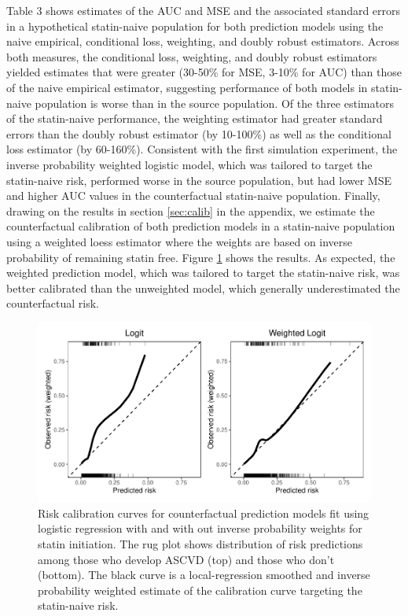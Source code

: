 Table 3 shows estimates of the AUC and MSE and the associated standard errors in a hypothetical statin-naive population for both prediction models using the naive empirical, conditional loss, weighting, and doubly robust estimators. Across both measures, the conditional loss, weighting, and doubly robust estimators yielded estimates that were greater (30-50\% for MSE, 3-10\% for AUC) than those of the naive empirical estimator, suggesting performance of both models in statin-naive population is worse than in the source population. Of the three estimators of the statin-naive performance, the weighting estimator had greater standard errors than the doubly robust estimator (by 10-100\%) as well as the conditional loss estimator (by 60-160\%). Consistent with the first simulation experiment, the inverse probability weighted logistic model, which was tailored to target the statin-naive risk, performed worse in the source population, but had lower MSE and higher AUC values in the counterfactual statin-naive population. Finally, drawing on the results in section \ref{sec:calib} in the appendix, we estimate the counterfactual calibration of both prediction models in a statin-naive population using a weighted loess estimator where the weights are based on inverse probability of remaining statin free. Figure \ref{fig:calib} shows the results. As expected, the weighted prediction model, which was tailored to target the statin-naive risk, was better calibrated than the unweighted model, which generally underestimated the counterfactual risk.

\begin{figure}[p]
    \centering
    \includegraphics{../3_figures/calib.pdf}
    \caption{Risk calibration curves for counterfactual prediction models fit using logistic regression with and with out inverse probability weights for statin initiation. The rug plot shows distribution of risk predictions among those who develop ASCVD (top) and those who don't (bottom). The black curve is a local-regression smoothed and inverse probability weighted estimate of the calibration curve targeting the statin-naive risk.\label{fig:calib}}
\end{figure}




